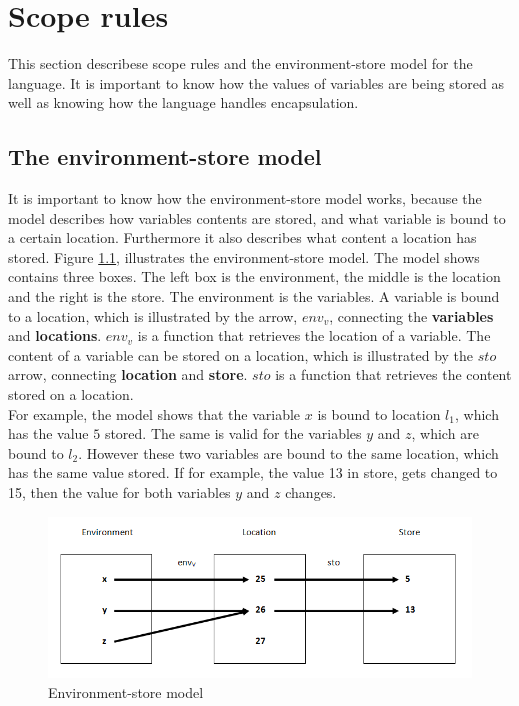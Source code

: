 \chapter{Scope rules}\label{chap:scope-rules}
This section describese scope rules and the environment-store model for the language. It is important to know how the values of variables are being stored as well as knowing how the language handles encapsulation. 

\section{The environment-store model}\label{sec:es-model}
It is important to know how the environment-store model works, because the model describes how variables contents are stored, and what variable is bound to a certain location. Furthermore it also describes what content a location has stored. Figure \ref{fig:esmodel}, illustrates the environment-store model. The model shows contains three boxes. The left box is the environment, the middle is the location and the right is the store. The environment is the variables. A variable is bound to a location, which is illustrated by the arrow, $env_v$, connecting the \textbf{variables} and \textbf{locations}. $env_v$ is a function that retrieves the location of a variable. The content of a variable can be stored on a location, which is illustrated by the $sto$ arrow, connecting \textbf{location} and \textbf{store}. $sto$ is a function that retrieves the content stored on a location. 
\\For example, the model shows that the variable $x$ is bound to location $l_{1}$, which has the value $5$ stored. The same is valid for the variables $y$ and $z$, which are bound to $l_{2}$. However these two variables are bound to the same location, which has the same value stored. If for example, the value 13 in store, gets changed to 15, then the value for both variables $y$ and $z$ changes. 
\begin{figure}[H]
\includegraphics{billeder/environment_store_model.png}
\caption{Environment-store model}
\label{fig:esmodel}
\end{figure}


